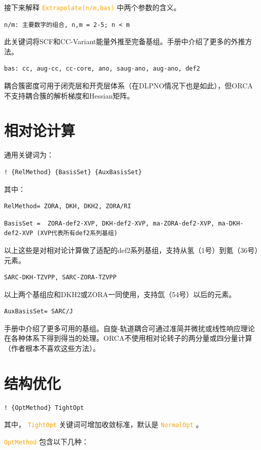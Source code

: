 \documentclass{ctexart}
\newcommand{\cmd}[1]{ \textcolor{orange}{\texttt{#1}} }
\begin{document}
	
	接下来解释\cmd{Extrapolate(n/m,bas)}中两个参数的含义。
	\begin{lstlisting}
n/m: 主要数字的组合, n,m = 2-5; n < m
	\end{lstlisting}
	
	此关键词将SCF和CC-Variant能量外推至完备基组。手册中介绍了更多的外推方法。
	\begin{lstlisting}
bas: cc, aug-cc, cc-core, ano, saug-ano, aug-ano, def2
	\end{lstlisting}
	耦合簇密度可用于闭壳层和开壳层体系（在DLPNO情况下也是如此），但ORCA不支持耦合簇的解析梯度和Hessian矩阵。
	
	\section{相对论计算} 
	通用关键词为：
	\begin{lstlisting}
! {RelMethod} {BasisSet} {AuxBasisSet}
	\end{lstlisting}
	
	其中：
	\begin{lstlisting}
RelMethod= ZORA, DKH, DKH2, ZORA/RI
	\end{lstlisting}
	\begin{lstlisting}
BasisSet =	ZORA-def2-XVP, DKH-def2-XVP, ma-ZORA-def2-XVP, ma-DKH-def2-XVP (XVP代表所有def2系列基组)
	\end{lstlisting}
	以上这些是对相对论计算做了适配的def2系列基组，支持从氢（1号）到氪（36号）元素。
	
	\begin{lstlisting}
SARC-DKH-TZVPP, SARC-ZORA-TZVPP
	\end{lstlisting}
	以上两个基组应和DKH2或ZORA一同使用，支持氙（54号）以后的元素。
	\begin{lstlisting}
AuxBasisSet= SARC/J
	\end{lstlisting}
	手册中介绍了更多可用的基组。自旋-轨道耦合可通过准简并微扰或线性响应理论在各种体系下得到得当的处理。ORCA不使用相对论转子的两分量或四分量计算（作者根本不喜欢这些方法）。
	
	\section{结构优化} 
	\begin{lstlisting}
! {OptMethod} TightOpt
	\end{lstlisting}
	
	其中，\cmd{TightOpt}关键词可增加收敛标准，默认是\cmd{NormalOpt}。
	
	\cmd{OptMethod} 包含以下几种：
	
\end{document}
